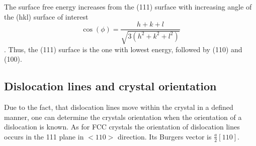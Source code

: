 The surface free energy increases from the (111) surface with increasing angle of the (hkl) surface of interest $$\cos(\phi)=\frac{h+k+l}{\sqrt{3(h^2+k^2+l^2)}}$$ \cite{jian-min_calculation_2004}. Thus, the (111) surface is the one with lowest energy, followed by (110) and (100).

\subsection{Dislocation lines and crystal orientation}
Due to the fact, that dislocation lines move within the crystal in a defined manner, one can determine the crystals orientation when the orientation of a dislocation is known.
As for FCC crystals the orientation of dislocation lines occurs in the {111} plane in $<110>$ direction. Its Burgers vector is $\frac{a}{2}[110]$\cite{_dislocation-theory}.